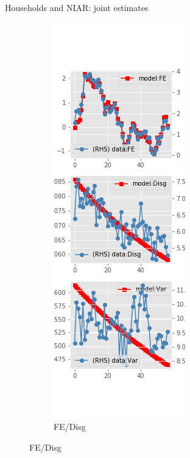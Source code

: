 \documentclass{beamer}
\begin{document}
\begin{frame}{Households and NIAR: joint estimates}
\begin{figure}[ht]
\begin{subfigure}[b]{0.2\textwidth}
		\end{subfigure}
		\hfill
		\begin{subfigure}[b]{0.2\textwidth}
			\caption{FE/Disg}
			\includegraphics[width=\textwidth, height = 0.8\textheight]{figuresDraft/sce_ni_est_joint_diag2.png}

\end{subfigure}
\end{figure}
\end{frame}
\end{document}
